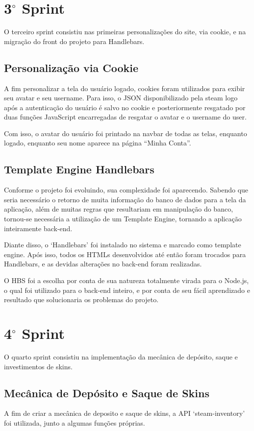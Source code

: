 \section{3$^{\circ}$ Sprint}
O terceiro sprint consistiu nas primeiras personalizações do site, via cookie, e na migração do front do projeto para Handlebars.

\subsection{Personalização via Cookie}
A fim personalizar a tela do usuário logado, cookies foram utilizados para 
exibir seu avatar e seu username. Para isso, o JSON disponibilizado pela steam logo 
após a autenticação do usuário é salvo no cookie e posteriormente resgatado por duas 
funções JavaScript encarregadas de resgatar o avatar e o username do user.

Com isso, o avatar do usuário foi printado na navbar de todas as telas, enquanto logado, enquanto seu nome 
aparece na página ``Minha Conta''.

\subsection{Template Engine Handlebars}
Conforme o projeto foi evoluindo, sua complexidade foi aparecendo. Sabendo que seria necessário o retorno 
de muita informação do banco de dados para a tela da aplicação, além de muitas regras que resultariam 
em manipulação do banco, tornou-se necessária a utilização de um Template Engine, tornando a aplicação 
inteiramente back-end. 

Diante disso, o ‘Handlebars’ foi instalado no sistema e marcado como template engine. Após isso, todos 
os HTMLs desenvolvidos até então foram trocados para Handlebars, e as devidas alterações no back-end 
foram realizadas.

O HBS foi a escolha por conta de sua natureza totalmente virada para o Node.js, o qual foi utilizado 
para o back-end inteiro, e por conta de seu fácil aprendizado e resultado que solucionaria os 
problemas do projeto.

\section{4$^{\circ}$ Sprint}
O quarto sprint consistiu na implementação da mecânica de depósito, saque e investimentos de skins.

\subsection{Mecânica de Depósito e Saque de Skins}
A fim de criar a mecânica de deposito e saque de skins, a API ‘steam-inventory’ foi utilizada, 
junto a algumas funções próprias.

